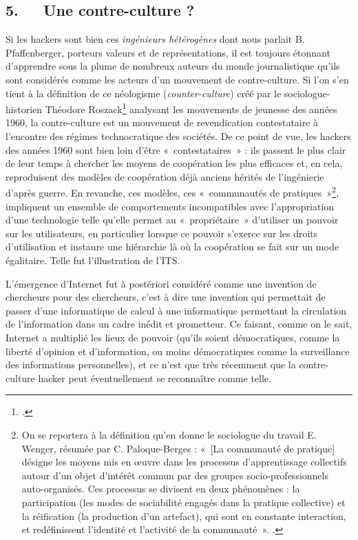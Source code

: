 \documentclass{FramateX}
\begin{document}
\begin{refsection}
\section*{5.~~~Une contre-culture ?}
{}

Si les hackers sont bien ces \textit{ingénieurs hétérogènes} dont nous
parlait B. Pfaffenberger, porteurs valeurs et de représentations, il
est toujours étonnant d'apprendre sous la plume de nombreux auteurs du
monde journalistique qu'ils sont considérés comme les acteurs d'un
mouvement de contre-culture. Si l'on s'en tient à la définition de ce
néologisme (\textit{counter-culture}) créé par le sociologue-historien
Théodore Roszack\footnote{\cite{roszakmaking1995}.} analysant les mouvements de jeunesse des
années 1960, la contre-culture est un mouvement de revendication
contestataire à l'encontre des régimes technocratique des sociétés. De
ce point de vue, les hackers des années 1960 sont bien loin d'être
«~contestataires~» : ils passent le plus clair de leur temps à chercher
les moyens de coopération les plus efficaces et, en cela, reproduisent
des modèles de coopération déjà anciens hérités de l'ingénierie d'après
guerre. En revanche, ces modèles, ces «~communautés de
pratiques~»\footnote{On se reportera à la définition
qu'en donne le sociologue du travail E. Wenger,
résumée par C. Paloque-Berges : «~[La communauté de pratique] désigne
les moyens mis en œuvre dans les processus
d'apprentissage collectifs autour
d'un objet d'intérêt commun par des
groupes socio-professionnels auto-organisés. Ces processus se divisent
en deux phénomènes : la participation (les modes de sociabilité engagés
dans la pratique collective) et la réification (la production
d'un artefact), qui sont en constante interaction, et
redéfinissent l'identité et
l'activité de la communauté~». \cite[p.~121]{paloquebergesmemoire2012}.},
impliquent un ensemble de comportements incompatibles avec
l'appropriation d'une technologie telle qu'elle permet au
«~propriétaire~» d'utiliser un pouvoir sur les utilisateurs, en
particulier lorsque ce pouvoir s'exerce sur les droits d'utilisation et
instaure une hiérarchie là où la coopération se fait sur un mode
égalitaire. Telle fut l'illustration de l'ITS.

L'émergence d'Internet fut à postériori considéré comme une invention de
chercheurs pour des chercheurs, c'est à dire une invention qui
permettait de passer d'une informatique de calcul à une informatique
permettant la circulation de l'information dans un cadre inédit et
prometteur. Ce faisant, comme on le sait, Internet a multiplié les
lieux de pouvoir (qu'ils soient démocratiques, comme la liberté
d'opinion et d'information, ou moins démocratiques comme la
surveillance des informations personnelles), et ce n'est que très
récemment que la contre-culture hacker peut éventuellement se
reconnaître comme telle. 


\end{refsection}
\end{document}

